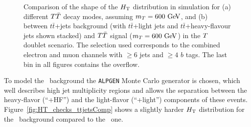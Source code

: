 \begin{figure}[h!tb]\begin{center}
	\caption{Comparison of the shape of the $\HT$ distribution in simulation for (a) different $\TT$ decay modes, assuming $m_{\T}=600\gev$,
and (b) between $t\bar{t}$+jets background (with $t\bar{t}$+light jets and $t\bar{t}$+heavy-flavour jets shown stacked) 
and $\TT$ signal ($m_{\T}=600\gev$) in the $\T$ doublet scenario.
The selection used corresponds to the combined electron and muon channels with $\geq 6$ jets and $\geq 4$ $b$ tags. 
The last bin in all figures contains the overflow.}
\end{center}\end{figure}

To model the \ttbar\ background
the \texttt{ALPGEN} Monte Carlo generator is chosen, which well
describes high jet multiplicity regions and allows the separation
between the heavy-flavor (``\ttbar+HF'') and the light-flavor
(``\ttbar+light'') components of these events.
Figure~\ref{fig:HT_checks_ttjetsComp} shows a slightly harder
$\HT$ distribution for the \tthf\ background compared to the
\ttlf\ one.

